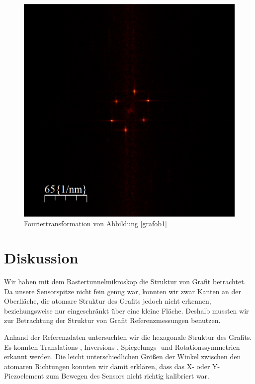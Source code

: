 \documentclass[10pt,a4paper]{article}
\begin{document}
\begin{figure}[h]
	\centering
	
	\includegraphics[scale = 0.5]{Fouriertrasformation_kristall.png}
	
	\caption{Fouriertransformation von Abbildung \ref{grafob1}}
	\label{fouriertansformation_ebene}
\end{figure}

\section{Diskussion}

Wir haben mit dem Rastertunnelmikroskop die Struktur von Grafit betrachtet. Da unsere Sensorspitze nicht fein genug war, konnten wir zwar Kanten an der Oberfläche, die atomare Struktur des Grafits jedoch nicht erkennen, beziehungsweise nur eingeschränkt über eine kleine Fläche. Deshalb mussten wir zur Betrachtung der Struktur von Grafit Referenzmessungen benutzen.

Anhand der Referenzdaten untersuchten wir die hexagonale Struktur des Grafits. Es konnten Translations-, Inversions-, Spiegelungs- und Rotationssymmetrien erkannt werden. Die leicht unterschiedlichen Größen der Winkel zwischen den atomaren Richtungen konnten wir damit erklären, dass das X- oder Y-Piezoelement zum Bewegen des Sensors nicht richtig kalibriert war.
\end{document}
